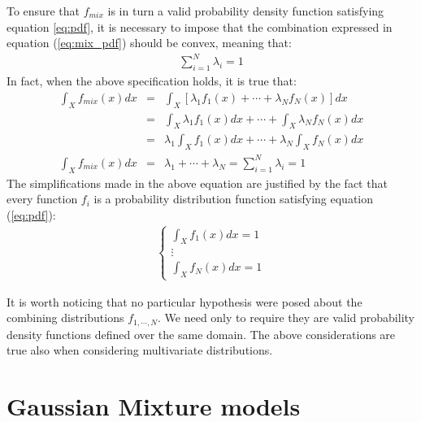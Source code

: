 \documentclass{article}
\begin{document}
To ensure that $f_{mix}$ is in turn a valid probability density function satisfying equation \ref{eq:pdf}, it is necessary to impose that the combination expressed in equation (\ref{eq:mix_pdf}) should be convex, meaning that:
\begin{eqnarray}
\sum_{i=1}^{N} \lambda_{i} = 1
\label{eq:sum_w_mix}
\end{eqnarray}
In fact, when the above specification holds, it is true that:
\begin{eqnarray}
\int_{X} f_{mix}(x) dx &=& \int_{X} [ \lambda_1 f_1(x) + \cdots + \lambda_N f_N(x) ] dx \nonumber\\
&=&  \int_{X}  \lambda_1 f_1(x) dx + \cdots + \int_{X} \lambda_N f_N(x) dx \nonumber\\
&=&   \lambda_1\int_{X} f_1(x) dx + \cdots + \lambda_N \int_{X} f_N(x) dx \nonumber\\
\int_{X} f_{mix}(x) dx &=&   \lambda_1 + \cdots + \lambda_N = \sum_{i=1}^{N} \lambda_{i} = 1
\end{eqnarray}
The simplifications made in the above equation are justified by the fact that every function $f_i$ is a probability distribution function satisfying equation (\ref{eq:pdf}):
\begin{eqnarray}
\left\{\begin{matrix}
\int_{X} f_1(x)dx = 1
\\ 
\vdots 
\\ 
\int_{X} f_N(x)dx = 1
\end{matrix}\right.
\end{eqnarray}

It is worth noticing that no particular hypothesis were posed about the combining distributions $f_{1,\cdots,N}$. We need only to require they are valid probability density functions defined over the same domain. The above considerations are true also when considering multivariate distributions.

\section{Gaussian Mixture models}
\end{document}
